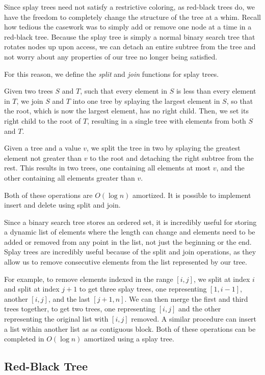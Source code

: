 Since splay trees need not satisfy a restrictive coloring, as red-black trees do, we have the freedom to completely change the structure of the tree at a whim. Recall how tedious the casework was to simply add or remove one node at a time in a red-black tree. Because the splay tree is simply a normal binary search tree that rotates nodes up upon access, we can detach an entire subtree from the tree and not worry about any properties of our tree no longer being satisfied.

For this reason, we define the \textit{split} and \textit{join} functions for splay trees.

Given two trees $S$ and $T$, such that every element in $S$ is less than every element in $T$, we join $S$ and $T$ into one tree by splaying the largest element in $S$, so that the root, which is now the largest element, has no right child. Then, we set its right child to the root of $T$, resulting in a single tree with elements from both $S$ and $T$.

Given a tree and a value $v$, we split the tree in two by splaying the greatest element not greater than $v$ to the root and detaching the right subtree from the rest. This results in two trees, one containing all elements at most $v$, and the other containing all elements greater than $v$.

Both of these operations are $O(\log{n})$ amortized. It is possible to implement insert and delete using split and join.

Since a binary search tree stores an ordered set, it is incredibly useful for storing a dynamic list of elements where the length can change and elements need to be added or removed from any point in the list, not just the beginning or the end. Splay trees are incredibly useful because of the split and join operations, as they allow us to remove consecutive elements from the list represented by our tree.

For example, to remove elements indexed in the range $[i, j]$, we split at index $i$ and split at index $j+1$ to get three splay trees, one representing $[1, i-1]$, another $[i,j]$, and the last $[j+1,n]$. We can then merge the first and third trees together, to get two trees, one representing $[i,j]$ and the other representing the original list with $[i,j]$ removed. A similar procedure can insert a list within another list as as contiguous block. Both of these operations can be completed in $O(\log{n})$ amortized using a splay tree.

\subsection{Red-Black Tree}

